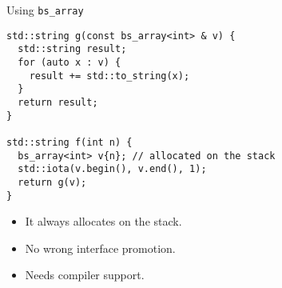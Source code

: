 \begin{frame}[t,fragile]{Using \texttt{bs\_array}}
\begin{lstlisting}[style=cpp11]
std::string g(const bs_array<int> & v) {
  std::string result;
  for (auto x : v) {
    result += std::to_string(x);
  }
  return result;
}

std::string f(int n) {
  bs_array<int> v{n}; // allocated on the stack
  std::iota(v.begin(), v.end(), 1);
  return g(v);
}
\end{lstlisting}
\begin{itemize}
  \item It always allocates on the stack.
  \item No wrong interface promotion.
  \item \alert{Needs compiler support}.
\end{itemize}
\end{frame}

